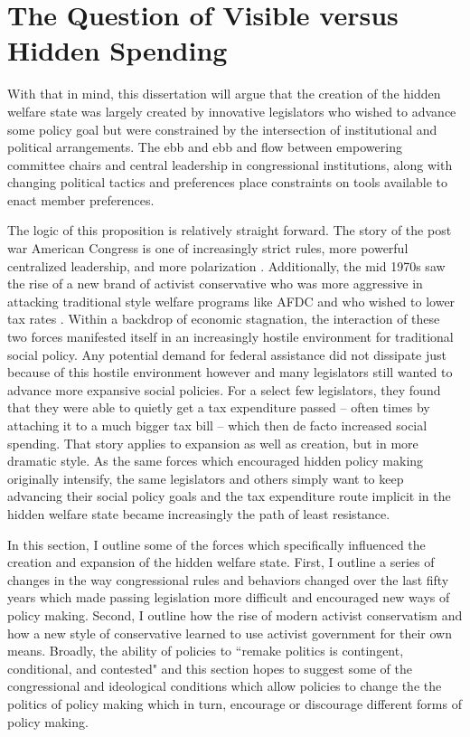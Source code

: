 \documentclass[12pt]{article}
\begin{document}
\section{The Question of Visible versus Hidden Spending}
With that in mind, this dissertation will argue that the creation of the hidden welfare state was largely created by innovative legislators who wished to advance some policy goal but were constrained by the intersection of institutional and political arrangements. The ebb and ebb and flow between empowering committee chairs and central leadership in congressional institutions, along with changing political tactics and preferences place constraints on tools available to enact member preferences.

The logic of this proposition is relatively straight forward. The story of the post war American Congress is one of increasingly strict rules, more powerful centralized leadership, and more polarization \citep{rohde1991, binder2003}. Additionally, the mid 1970s saw the rise of a new brand of activist conservative who was more aggressive in attacking traditional style welfare programs like AFDC and who wished to lower tax rates \citep{hacker2007}. Within a backdrop of economic stagnation, the interaction of these two forces manifested itself in an increasingly hostile environment for traditional social policy. Any potential demand for federal assistance did not dissipate just because of this hostile environment however and many legislators still wanted to advance more expansive social policies. For a select few legislators, they found that they were able to quietly get a tax expenditure passed -- often times by attaching it to a much bigger tax bill -- which then de facto increased social spending. That story applies to expansion as well as creation, but in more dramatic style. As the same forces which encouraged hidden policy making originally intensify, the same legislators and others simply want to keep advancing their social policy goals and the tax expenditure route implicit in the hidden welfare state became increasingly the path of least resistance. 

In this section, I outline some of the forces which specifically influenced the creation and expansion of the hidden welfare state. First, I outline a series of changes in the way congressional rules and behaviors changed over the last fifty years which made passing legislation more difficult and encouraged new ways of policy making. Second, I outline how the rise of modern activist conservatism and how a new style of conservative learned to use activist government for their own means. Broadly, the ability of policies to ``remake politics is contingent, conditional, and contested" \citep[Pg. 172]{patashnik2013} and this section hopes to suggest some of the congressional and ideological conditions which allow policies to change the the politics of policy making which in turn, encourage or discourage different forms of policy making.
\end{document}
